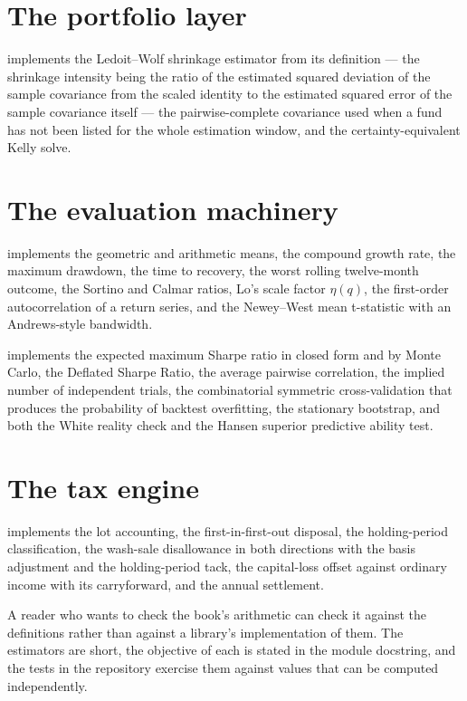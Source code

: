 \section{The portfolio layer}

 implements the Ledoit--Wolf shrinkage
estimator from its definition --- the shrinkage intensity being the ratio
of the estimated squared deviation of the sample covariance from the
scaled identity to the estimated squared error of the sample covariance
itself --- the pairwise-complete covariance used when a fund has not been
listed for the whole estimation window, and the certainty-equivalent Kelly
solve.

\section{The evaluation machinery}

 implements the geometric and arithmetic
means, the compound growth rate, the maximum drawdown, the time to
recovery, the worst rolling twelve-month outcome, the Sortino and Calmar
ratios, Lo's scale factor \(\eta(q)\), the first-order autocorrelation of
a return series, and the Newey--West mean t-statistic with an
Andrews-style bandwidth.

 implements the expected maximum Sharpe
ratio in closed form and by Monte Carlo, the Deflated Sharpe Ratio, the
average pairwise correlation, the implied number of independent trials,
the combinatorial symmetric cross-validation that produces the
probability of backtest overfitting, the stationary bootstrap, and both
the White reality check and the Hansen superior predictive ability test.

\section{The tax engine}

 implements the lot accounting, the
first-in-first-out disposal, the holding-period classification, the
wash-sale disallowance in both directions with the basis adjustment and
the holding-period tack, the capital-loss offset against ordinary income
with its carryforward, and the annual settlement.

\begin{takeaway}
A reader who wants to check the book's arithmetic can check it against
the definitions rather than against a library's implementation of them.
The estimators are short, the objective of each is stated in the module
docstring, and the tests in the repository exercise them against values
that can be computed independently.
\end{takeaway}
\clearpage

